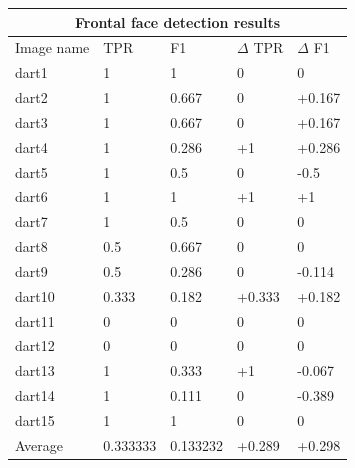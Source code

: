 \documentclass{article}
\begin{document}
\begin{multicols}{2}
{
}

\begin{center}
\begin{tabular}{ |p{1.3cm}||p{1.3cm}|p{1.3cm}|p{1.3cm}|p{1.3cm}| }
 \hline
 \multicolumn{5}{|c|}{Frontal face detection results} \\
 \hline
 Image name & TPR & F1 & \(\Delta\) TPR & \(\Delta\) F1 \\
 \hline
 dart1  & 1  & 1 & 0 & 0 \\
 dart2  & 1  & 0.667 & 0 & +0.167       \\
 dart3  & 1  & 0.667 & 0 & +0.167      \\
 dart4  & 1  & 0.286 & +1 & +0.286         \\
 dart5  & 1  & 0.5 & 0 & -0.5         \\
 dart6  & 1  & 1 & +1 & +1 \\
 dart7  & 1  & 0.5 & 0 & 0         \\
 dart8  & 0.5  & 0.667 & 0 & 0   \\
 dart9  & 0.5  & 0.286 & 0 & -0.114           \\
 dart10 & 0.333  & 0.182 & +0.333 & +0.182          \\
 dart11 & 0  & 0 & 0 & 0 \\
 dart12 & 0  & 0 & 0 & 0         \\
 dart13 & 1  & 0.333 & +1 & -0.067         \\
 dart14 & 1  & 0.111 & 0 & -0.389        \\
 dart15 & 1  & 1   & 0 & 0     \\
 \hline
 Average& 0.333333  & 0.133232 & +0.289 & +0.298   \\ 
 \hline
\end{tabular}
\label{tab:vjhoughdartstable}
\end{center}


\end{multicols}
\end{document}

